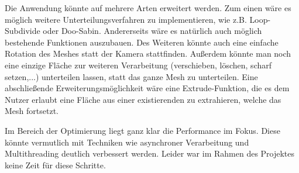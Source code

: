 Die Anwendung könnte auf mehrere Arten erweitert werden.
Zum einen wäre es möglich weitere Unterteilungsverfahren zu implementieren, wie z.B. Loop-Subdivide oder Doo-Sabin.
Andererseits wäre es natürlich auch möglich bestehende Funktionen auszubauen.
Des Weiteren könnte auch eine einfache Rotation des Meshes statt der Kamera stattfinden.
Au\ss{}erdem könnte man noch eine einzige Fläche zur weiteren Verarbeitung (verschieben, löschen, scharf setzen,...) unterteilen lassen, statt das ganze Mesh zu unterteilen.
Eine abschlie\ss{}ende Erweiterungsmöglichkeit wäre eine Extrude-Funktion, die es dem Nutzer erlaubt eine Fläche aus einer existierenden zu extrahieren, welche das Mesh fortsetzt.

Im Bereich der Optimierung liegt ganz klar die Performance im Fokus. 
Diese könnte vermutlich mit Techniken wie asynchroner Verarbeitung und Multithreading deutlich verbessert werden.
Leider war im Rahmen des Projektes keine Zeit für diese Schritte.
